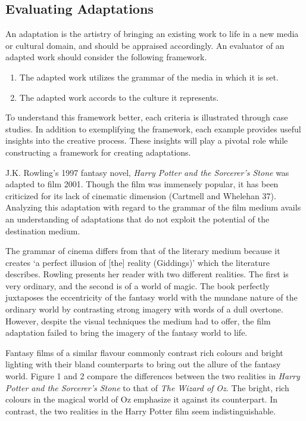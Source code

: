 \documentclass[12pt]{article}
\begin{document}
\pagebreak
\subsection*{Evaluating Adaptations}
An adaptation is the artistry of bringing an existing work to life in a new
media or cultural domain, and should be appraised accordingly. An evaluator
of an adapted work should consider the following framework.

\begin{enumerate}
\item The adapted work utilizes the grammar of the media in which it is set.
\item The adapted work accords to the culture it represents.
\end{enumerate}

To understand this framework better, each criteria is illustrated
through case studies. In addition to exemplifying the framework, 
each example provides useful insights into the creative process. 
These insights will play a pivotal role while constructing a
framework for creating adaptations.  

J.K. Rowling's 1997 fantasy novel, \textit{Harry Potter and the Sorcerer's Stone} 
was adapted to film 2001. Though the film was immensely popular, it has been
criticized for its lack of cinematic dimension (Cartmell and Whelehan 37).
Analyzing this adaptation with regard to the grammar of the film medium
avails an understanding of adaptations that do not exploit the potential of the
destination medium.

The grammar of cinema differs from that of the literary medium because it
creates `a perfect illusion of [the] reality (Giddings)' which the literature describes. 
Rowling presents her reader with two different realities. 
The first is very ordinary, and the second is of a world of magic. 
The book perfectly juxtaposes the eccentricity of the fantasy world with the
mundane nature of the ordinary world by contrasting strong imagery with words
of a dull overtone. However, despite the visual techniques the medium had to offer, the
film adaptation failed to bring the imagery of the fantasy world to life.

Fantasy films of a similar flavour commonly contrast rich colours and bright lighting
with their bland counterparts to bring out the allure of the fantasy world.
Figure 1  and 2 compare the differences between the two realities in \textit{Harry
Potter and the Sorcerer's Stone} to that of \textit{The Wizard of Oz}. The bright, 
rich colours in the magical world of Oz emphasize it against
its counterpart. In contrast, the two realities in the Harry Potter film seem
indistinguishable. 
\end{document}
